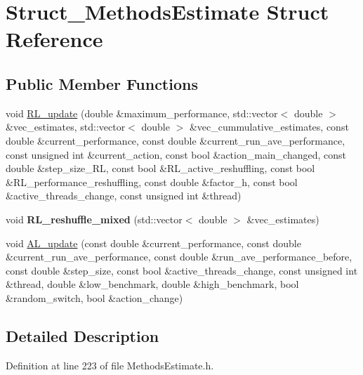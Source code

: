 \hypertarget{structStruct__MethodsEstimate}{\section{Struct\-\_\-\-Methods\-Estimate Struct Reference}
\label{structStruct__MethodsEstimate}
}
\subsection*{Public Member Functions}
\begin{DoxyCompactItemize}
\item 
void \hyperlink{structStruct__MethodsEstimate_a79b0089392ec35169c185f465f88b675}{R\-L\-\_\-update} (double \&maximum\-\_\-performance, std\-::vector$<$ double $>$ \&vec\-\_\-estimates, std\-::vector$<$ double $>$ \&vec\-\_\-cummulative\-\_\-estimates, const double \&current\-\_\-performance, const double \&current\-\_\-run\-\_\-ave\-\_\-performance, const unsigned int \&current\-\_\-action, const bool \&action\-\_\-main\-\_\-changed, const double \&step\-\_\-size\-\_\-\-R\-L, const bool \&R\-L\-\_\-active\-\_\-reshuffling, const bool \&R\-L\-\_\-performance\-\_\-reshuffling, const double \&factor\-\_\-h, const bool \&active\-\_\-threads\-\_\-change, const unsigned int \&thread)
\item 
\hypertarget{structStruct__MethodsEstimate_a13f8ba793252f8883a1769dbee5ddaaa}{void {\bfseries R\-L\-\_\-reshuffle\-\_\-mixed} (std\-::vector$<$ double $>$ \&vec\-\_\-estimates)}\label{structStruct__MethodsEstimate_a13f8ba793252f8883a1769dbee5ddaaa}

\item 
void \hyperlink{structStruct__MethodsEstimate_a81e63589cf2c8a3f83fbef1a16491aea}{A\-L\-\_\-update} (const double \&current\-\_\-performance, const double \&current\-\_\-run\-\_\-ave\-\_\-performance, const double \&run\-\_\-ave\-\_\-performance\-\_\-before, const double \&step\-\_\-size, const bool \&active\-\_\-threads\-\_\-change, const unsigned int \&thread, double \&low\-\_\-benchmark, double \&high\-\_\-benchmark, bool \&random\-\_\-switch, bool \&action\-\_\-change)
\end{DoxyCompactItemize}


\subsection{Detailed Description}


Definition at line 223 of file Methods\-Estimate.\-h.



